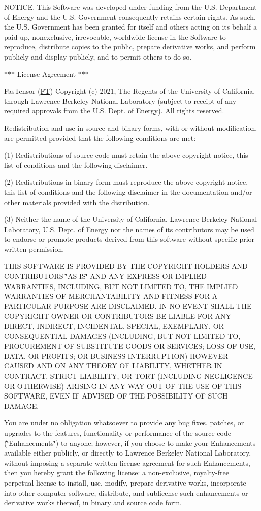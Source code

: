 NOTICE. This Software was developed under funding from the U.\+S. Department of Energy and the U.\+S. Government consequently retains certain rights. As such, the U.\+S. Government has been granted for itself and others acting on its behalf a paid-\/up, nonexclusive, irrevocable, worldwide license in the Software to reproduce, distribute copies to the public, prepare derivative works, and perform publicly and display publicly, and to permit others to do so.



$\ast$$\ast$$\ast$ License Agreement $\ast$$\ast$$\ast$

Fas\+Tensor (\mbox{\hyperlink{namespace_f_t}{FT}}) Copyright (c) 2021, The Regents of the University of California, through Lawrence Berkeley National Laboratory (subject to receipt of any required approvals from the U.\+S. Dept. of Energy). All rights reserved.

Redistribution and use in source and binary forms, with or without modification, are permitted provided that the following conditions are met\+:

(1) Redistributions of source code must retain the above copyright notice, this list of conditions and the following disclaimer.

(2) Redistributions in binary form must reproduce the above copyright notice, this list of conditions and the following disclaimer in the documentation and/or other materials provided with the distribution.

(3) Neither the name of the University of California, Lawrence Berkeley National Laboratory, U.\+S. Dept. of Energy nor the names of its contributors may be used to endorse or promote products derived from this software without specific prior written permission.

THIS SOFTWARE IS PROVIDED BY THE COPYRIGHT HOLDERS AND CONTRIBUTORS \char`\"{}\+AS IS\char`\"{} AND ANY EXPRESS OR IMPLIED WARRANTIES, INCLUDING, BUT NOT LIMITED TO, THE IMPLIED WARRANTIES OF MERCHANTABILITY AND FITNESS FOR A PARTICULAR PURPOSE ARE DISCLAIMED. IN NO EVENT SHALL THE COPYRIGHT OWNER OR CONTRIBUTORS BE LIABLE FOR ANY DIRECT, INDIRECT, INCIDENTAL, SPECIAL, EXEMPLARY, OR CONSEQUENTIAL DAMAGES (INCLUDING, BUT NOT LIMITED TO, PROCUREMENT OF SUBSTITUTE GOODS OR SERVICES; LOSS OF USE, DATA, OR PROFITS; OR BUSINESS INTERRUPTION) HOWEVER CAUSED AND ON ANY THEORY OF LIABILITY, WHETHER IN CONTRACT, STRICT LIABILITY, OR TORT (INCLUDING NEGLIGENCE OR OTHERWISE) ARISING IN ANY WAY OUT OF THE USE OF THIS SOFTWARE, EVEN IF ADVISED OF THE POSSIBILITY OF SUCH DAMAGE.

You are under no obligation whatsoever to provide any bug fixes, patches, or upgrades to the features, functionality or performance of the source code (\char`\"{}\+Enhancements\char`\"{}) to anyone; however, if you choose to make your Enhancements available either publicly, or directly to Lawrence Berkeley National Laboratory, without imposing a separate written license agreement for such Enhancements, then you hereby grant the following license\+: a non-\/exclusive, royalty-\/free perpetual license to install, use, modify, prepare derivative works, incorporate into other computer software, distribute, and sublicense such enhancements or derivative works thereof, in binary and source code form. 